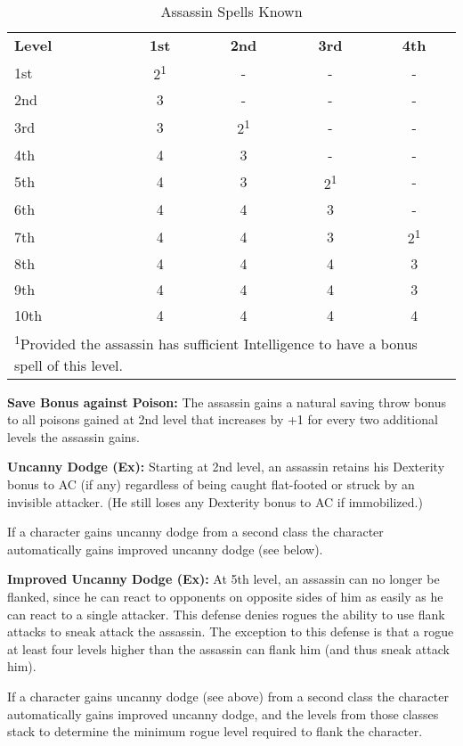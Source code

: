 \begin{table}[htb]
\mcinherit
\caption{Assassin Spells Known}
\centering
\begin{tabular}{l*{4}{c}}
\textbf{Level} & \textbf{1st} & \textbf{2nd} & \textbf{3rd} & \textbf{4th}\\
1st & 2\textsuperscript{1} & - & - & -\\
2nd & 3 & - & - & -\\
3rd & 3 & 2\textsuperscript{1} & - & -\\
4th & 4 & 3 & - & -\\
5th & 4 & 3 & 2\textsuperscript{1} & -\\
6th & 4 & 4 & 3 & -\\
7th & 4 & 4 & 3 & 2\textsuperscript{1}\\
8th & 4 & 4 & 4 & 3\\
9th & 4 & 4 & 4 & 3\\
10th & 4 & 4 & 4 & 4\\
\multicolumn{5}{p{7cm}}{\textsuperscript{1}Provided the assassin has sufficient Intelligence to have a bonus spell of this level.}\\
\end{tabular}
\end{table}

\textbf{Save Bonus against Poison:} The assassin gains a natural saving throw bonus 
to all poisons gained at 2nd level that increases by +1 for every two additional 
levels the assassin gains.

\textbf{Uncanny Dodge (Ex):} Starting at 2nd level, an assassin retains his Dexterity 
bonus to AC (if any) regardless of being caught flat-footed or struck by an invisible 
attacker. (He still loses any Dexterity bonus to AC if immobilized.)

If a character gains uncanny dodge from a second class the character automatically 
gains improved uncanny dodge (see below).

\textbf{Improved Uncanny Dodge (Ex):} At 5th level, an assassin can no longer be 
flanked, since he can react to opponents on opposite sides of him as easily as 
he can react to a single attacker. This defense denies rogues the ability to use 
flank attacks to sneak attack the assassin. The exception to this defense is that 
a rogue at least four levels higher than the assassin can flank him (and thus sneak 
attack him).

If a character gains uncanny dodge (see above) from a second class the character 
automatically gains improved uncanny dodge, and the levels from those classes stack 
to determine the minimum rogue level required to flank the character.


